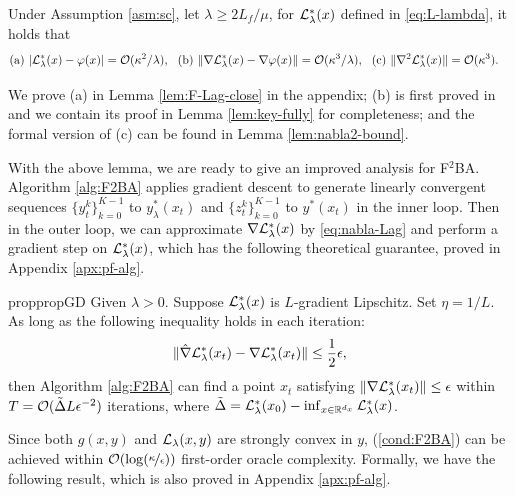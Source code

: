 \documentclass{article}
\begin{document}
\begin{lem} \label{lem:1st}
Under Assumption \ref{asm:sc}, let $\lambda \ge 2L_f /\mu $, for ${\mathcal{L}}_{\lambda}^*(x)$ defined in \eqref{eq:L-lambda}, it holds that 
\begin{align*}
    &{\rm(a)}~ \vert {\mathcal{L}}_{\lambda}^*(x) - \varphi(x) \vert ={\mathcal{O}}(\kappa^2/ \lambda), ~~{\rm (b)}~ \Vert \nabla {\mathcal{L}}_{\lambda}^*(x) - \nabla \varphi(x) \Vert = {\mathcal{O}}(\kappa^3 /\lambda),~~{\rm (c)}~ \Vert \nabla^2 {\mathcal{L}}_{\lambda}^*(x) \Vert = {\mathcal{O}}(\kappa^3).
\end{align*}
\end{lem}
We prove (a)  in Lemma \ref{lem:F-Lag-close} in the appendix; (b) is first proved in \cite{kwon2023fully} and we contain its proof in Lemma \ref{lem:key-fully} for completeness; and the formal version of (c) can be found in Lemma \ref{lem:nabla2-bound}. 

With the above lemma, we are ready to give an improved analysis for F${}^2$BA. Algorithm \ref{alg:F2BA} applies gradient descent to generate linearly convergent sequences $ \{y_t^k \}_{k=0}^{K-1}$ to $y_{\lambda}^*(x_t)$ and $ \{ z_t^k\}_{k=0}^{K-1}$ to $y^*(x_t)$ in the inner loop. Then in the outer loop, we can approximate $\nabla {\mathcal{L}}_{\lambda}^*(x)$ by \eqref{eq:nabla-Lag}  and perform a gradient step on ${\mathcal{L}}_{\lambda}^*(x)$, which has the following theoretical guarantee, proved in Appendix \ref{apx:pf-alg}.

\begin{restatable}{prop}{propGD} \label{prop:iGD}
    Given $\lambda >0$. Suppose ${\mathcal{L}}_{\lambda}^*(x)$ is $L$-gradient Lipschitz.  Set $\eta = 1/L$. As long as the following inequality holds in each
iteration:
\begin{align} \label{cond:F2BA}
    \Vert \hat \nabla {\mathcal{L}}_{\lambda}^*(x_t) - \nabla {\mathcal{L}}_{\lambda}^*(x_t) \Vert \le \frac{1}{2} \epsilon,
\end{align} 
then Algorithm \ref{alg:F2BA} can find a point 
$x_t$
satisfying $ \Vert \nabla {\mathcal{L}}_{\lambda}^*(x_t) \Vert \le \epsilon$ within $T = {\mathcal{O}}(\tilde \Delta L \epsilon^{-2})$ iterations, where $\tilde \Delta = {\mathcal{L}}_{\lambda}^*(x_0) - \inf_{x \in {\mathbb{R}}^{d_x}} {\mathcal{L}}_{\lambda}^*(x)$.
\end{restatable}


Since both $g(x,y)$ and ${\mathcal{L}}_{\lambda}(x,y)$ are strongly convex in $y$, (\ref{cond:F2BA})  can be achieved within ${\mathcal{O}}( \log (\nicefrac{\kappa}{\epsilon}) )$ first-order oracle complexity. 
Formally, we have the following result, which is also proved in Appendix \ref{apx:pf-alg}.
\end{document}
